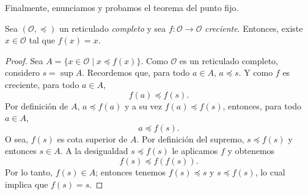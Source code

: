 Finalmente, enunciamos y probamos el teorema del punto fijo.

\begin{theorem}
	Sea $(\mathcal{O}, \preceq)$ un reticulado \textit{completo} y sea $f: \mathcal{O} \to  \mathcal{O}$ \textit{creciente}. Entonces, existe $x \in \mathcal{O}$ tal que $f(x)= x$.
\end{theorem}

\begin{proof}
	Sea $A = \{ x \in \mathcal{O} \mid x \preceq f(x) \}$. Como $\mathcal{O}$ es un reticulado completo, considero $s = \sup A$. Recordemos que, para todo $a \in A$, $a \preceq s$. Y como $f$ es creciente, para todo $a \in A$,
	$$
		f(a) \preceq f(s).
	$$
	Por definición de $A$, $a \preceq f(a)$ y a su vez $f(a) \preceq f(s)$, entonces, para todo $a \in A$,
	$$
		a \preceq f(s).
	$$
	O sea, $f(s)$ es cota superior de $A$. Por definición del supremo, $s \preceq f(s)$ y entonces $s \in A$. A la desigualdad $s \preceq f(s)$ le aplicamos $f$ y obtenemos
	$$
		f(s) \preceq f(f(s)).
	$$
	Por lo tanto, $f(s) \in A$; entonces tenemos $f(s) \preceq s$ y $s \preceq f(s)$, lo cual implica que $f(s) = s$.
\end{proof}


